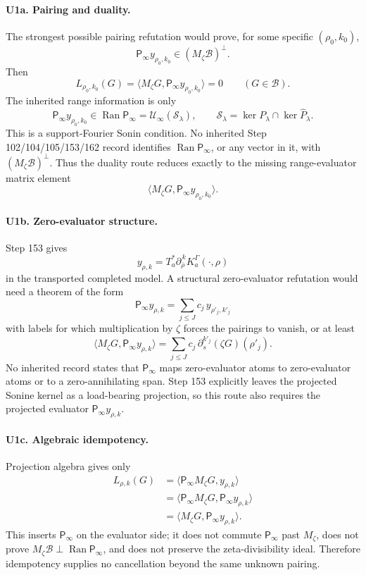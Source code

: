 \documentclass[11pt]{article}
\newcommand{\Psym}{\mathsf P_\infty}
\newcommand{\Mz}{M_\zeta}
\newcommand{\Uinf}{\mathcal U_\infty}
\newcommand{\Ran}{\operatorname{Ran}}
\newcommand{\Blegal}{\mathcal B}
\begin{document}
\paragraph{U1a. Pairing and duality.}
The strongest possible pairing refutation would prove, for some specific
\((\rho_0,k_0)\),
\[
  \Psym y_{\rho_0,k_0}\in(\Mz\Blegal)^\perp.
\]
Then
\[
  L_{\rho_0,k_0}(G)
  =
  \langle \Mz G,\Psym y_{\rho_0,k_0}\rangle
  =
  0
  \qquad(G\in\Blegal).
\]
The inherited range information is only
\[
  \Psym y_{\rho_0,k_0}\in\Ran\Psym
  =
  \Uinf(\mathcal S_\lambda),
  \qquad
  \mathcal S_\lambda=\ker P_\lambda\cap\ker\widehat P_\lambda.
\]
This is a support-Fourier Sonin condition.  No inherited Step
102/104/105/153/162 record identifies \(\Ran\Psym\), or any vector in it, with
\((\Mz\Blegal)^\perp\).  Thus the duality route reduces exactly to the missing
range-evaluator matrix element
\[
  \langle \Mz G,\Psym y_{\rho_0,k_0}\rangle.
\]

\paragraph{U1b. Zero-evaluator structure.}
Step 153 gives
\[
  y_{\rho,k}
  =
  T_a^*\partial_{\overline\rho}^{\,k}K_a^\Gamma(\cdot,\rho)
\]
in the transported completed model.  A structural zero-evaluator refutation
would need a theorem of the form
\[
  \Psym y_{\rho,k}
  =
  \sum_{j\le J}c_j\,y_{\rho'_j,k'_j}
\]
with labels for which multiplication by \(\zeta\) forces the pairings to
vanish, or at least
\[
  \langle \Mz G,\Psym y_{\rho,k}\rangle
  =
  \sum_{j\le J}c_j\,\partial_s^{k'_j}(\zeta G)(\rho'_j).
\]
No inherited record states that \(\Psym\) maps zero-evaluator atoms to
zero-evaluator atoms or to a zero-annihilating span.  Step 153 explicitly
leaves the projected Sonine kernel as a load-bearing projection, so this route
also requires the projected evaluator \(\Psym y_{\rho,k}\).

\paragraph{U1c. Algebraic idempotency.}
Projection algebra gives only
\[
\begin{aligned}
  L_{\rho,k}(G)
  &=\langle \Psym\Mz G,y_{\rho,k}\rangle \\
  &=\langle \Psym\Mz G,\Psym y_{\rho,k}\rangle \\
  &=\langle \Mz G,\Psym y_{\rho,k}\rangle .
\end{aligned}
\]
This inserts \(\Psym\) on the evaluator side; it does not commute
\(\Psym\) past \(M_\zeta\), does not prove \(\Mz\Blegal\perp\Ran\Psym\), and
does not preserve the zeta-divisibility ideal.  Therefore idempotency supplies
no cancellation beyond the same unknown pairing.
\end{document}
